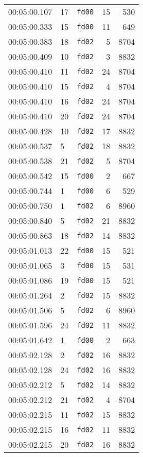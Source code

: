 \documentclass{article}
\begin{document}
\begin{longtable}{lllrr}
00:05:00.107 & 17 & \texttt{fd00} & 15 & 530 \\
00:05:00.333 & 15 & \texttt{fd00} & 11 & 649 \\
00:05:00.383 & 18 & \texttt{fd02} & 5 & 8704 \\
00:05:00.409 & 10 & \texttt{fd02} & 3 & 8832 \\
00:05:00.410 & 11 & \texttt{fd02} & 24 & 8704 \\
00:05:00.410 & 15 & \texttt{fd02} & 4 & 8704 \\
00:05:00.410 & 16 & \texttt{fd02} & 24 & 8704 \\
00:05:00.410 & 20 & \texttt{fd02} & 24 & 8704 \\
00:05:00.428 & 10 & \texttt{fd02} & 17 & 8832 \\
00:05:00.537 & 5 & \texttt{fd02} & 18 & 8832 \\
00:05:00.538 & 21 & \texttt{fd02} & 5 & 8704 \\
00:05:00.542 & 15 & \texttt{fd00} & 2 & 667 \\
00:05:00.744 & 1 & \texttt{fd00} & 6 & 529 \\
00:05:00.750 & 1 & \texttt{fd02} & 6 & 8960 \\
00:05:00.840 & 5 & \texttt{fd02} & 21 & 8832 \\
00:05:00.863 & 18 & \texttt{fd02} & 14 & 8832 \\
00:05:01.013 & 22 & \texttt{fd00} & 15 & 521 \\
00:05:01.065 & 3 & \texttt{fd00} & 15 & 531 \\
00:05:01.086 & 19 & \texttt{fd00} & 15 & 521 \\
00:05:01.264 & 2 & \texttt{fd02} & 15 & 8832 \\
00:05:01.506 & 5 & \texttt{fd02} & 6 & 8960 \\
00:05:01.596 & 24 & \texttt{fd02} & 11 & 8832 \\
00:05:01.642 & 1 & \texttt{fd00} & 2 & 663 \\
00:05:02.128 & 2 & \texttt{fd02} & 16 & 8832 \\
00:05:02.128 & 24 & \texttt{fd02} & 16 & 8832 \\
00:05:02.212 & 5 & \texttt{fd02} & 14 & 8832 \\
00:05:02.212 & 21 & \texttt{fd02} & 4 & 8704 \\
00:05:02.215 & 11 & \texttt{fd02} & 15 & 8832 \\
00:05:02.215 & 16 & \texttt{fd02} & 11 & 8832 \\
00:05:02.215 & 20 & \texttt{fd02} & 16 & 8832 \\

\end{longtable}
\end{document}
